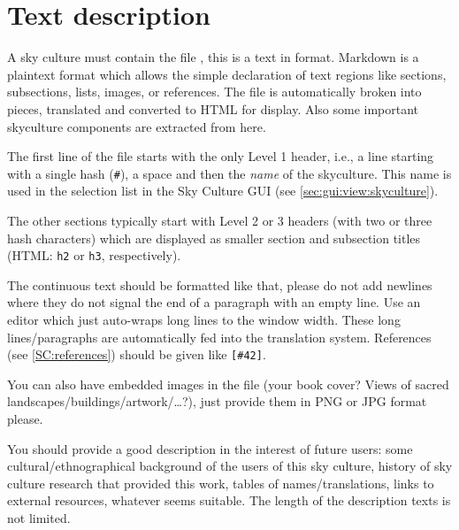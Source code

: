 \iffalse


You can take the \file{inuit} directory as template to start with. Just copy the folder 
\file{C:\textbackslash{}Program Files\textbackslash{}Stellarium\textbackslash{}skycultures\textbackslash{}inuit} to
\file{C:\textbackslash{}Users\textbackslash{}[YOU]\textbackslash{}AppData\textbackslash{}Roaming\textbackslash{}Stellarium\textbackslash{} skycultures\textbackslash{}myculture}

In the folder you see image files for the constellation artwork, and all
other files with various extensions are text files. 
\fi


\section{Text description}
\label{sec:skycultures:description}
\label{SC:description.md}


A sky culture must contain the file , this is a text in  format. 
Markdown is a plaintext format which allows the simple declaration of text regions like sections, subsections, lists, images, or references. 
The file is automatically broken into pieces, translated and converted to HTML for display. Also some important skyculture components are extracted from here.

The first line of the file starts with the only Level 1 header, 
i.e., a line starting with a single hash (\texttt{\#}), 
a space and then the \emph{name} of the skyculture. 
This name is used in the selection list in the Sky Culture GUI (see \ref{sec:gui:view:skyculture}). 
 
The other sections typically start with Level 2 or 3 headers (with two or three hash characters) which are displayed as smaller section and 
subsection titles (HTML: \texttt{h2} or \texttt{h3}, respectively).  

The continuous text should be formatted like that, please do not add newlines where they do not signal the end of a paragraph with an empty line. 
Use an editor which just auto-wraps long lines to the window width. 
These long lines/paragraphs are automatically fed into the translation system. References (see \ref{SC:references}) should be given like \texttt{[\#42]}.
 
You can also have embedded images in the file (your book cover?
Views of sacred landscapes/buildings/artwork/\ldots?), just provide them in 
PNG or JPG format please. 

You should provide a good description in the interest of future users:
some cultural/ethnographical background of the users of this sky culture,
history of sky culture research that provided this work, tables of names/translations,
links to external resources, whatever seems suitable.  The length of the description texts is not limited.

